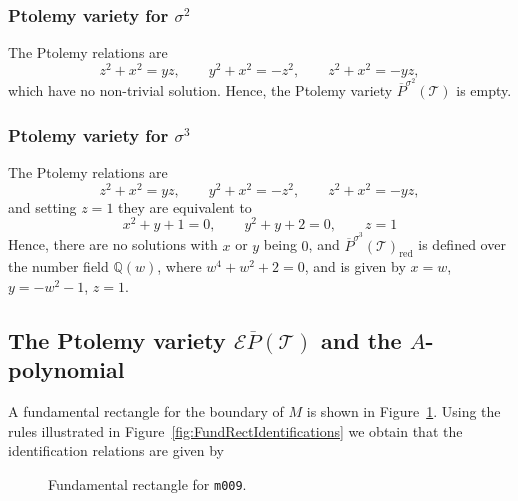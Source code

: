 \documentclass[11pt]{amsart}
\theoremstyle{plain}
\theoremstyle{definition}
\numberwithin{equation}{section}
\newcommand{\Q}{\mathbb Q}
\newcommand{\T}{\mathcal T}
\newcommand{\E}{\mathcal E}
\DeclareMathOperator{\red}{red}
\begin{document}
\subsubsection{Ptolemy variety for $\sigma^2$}
The Ptolemy relations are
\begin{equation}
z^2+x^2=yz,\qquad y^2+x^2=-z^2,\qquad z^2+x^2=-yz,
\end{equation}
which have no non-trivial solution. Hence, the Ptolemy variety $\overline P^{\sigma^2}(\T)$ is empty.
\subsubsection{Ptolemy variety for $\sigma^3$}
The Ptolemy relations are
\begin{equation}
z^2+x^2=yz,\qquad y^2+x^2=-z^2,\qquad z^2+x^2=-yz,
\end{equation} 
and setting $z=1$ they are equivalent to
\begin{equation}
 x^2 + y + 1=0,\qquad y^2 + y + 2=0,\qquad z=1
\end{equation}
Hence, there are no solutions with $x$ or $y$ being $0$, and $\overline P^{\sigma^3}(\T)_{\red}$ is defined over the number field $\Q(w)$, where $w^4+w^2+2=0$, and is given by $x=w$, $y=-w^2-1$, $z=1$.

\subsection{The Ptolemy variety $\E\overline P(\T)$ and the $A$-polynomial}\label{sec:Apolyexample}
A fundamental rectangle for the boundary of $M$ is shown in Figure~\ref{fig:FundamentalRectangle}. Using the rules illustrated in Figure~\ref{fig:FundRectIdentifications} we obtain that the identification relations are given by

\begin{figure}[htb]
\scalebox{0.7}{}
\caption{Fundamental rectangle for \texttt{m009}.}\label{fig:FundamentalRectangle}
\end{figure}
\end{document}
